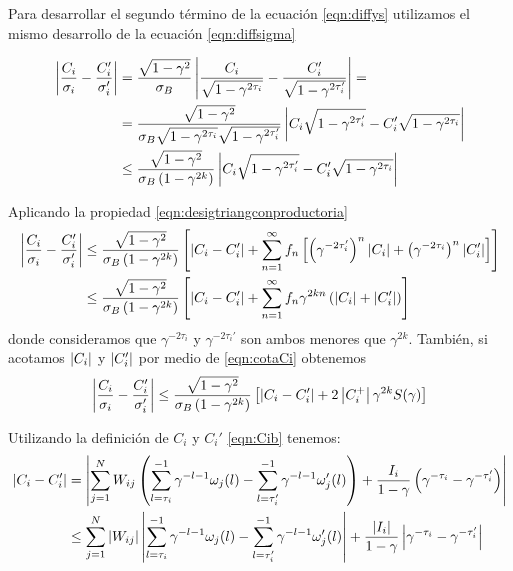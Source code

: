 Para desarrollar el segundo término de la ecuación \eqref{eqn:diffys} utilizamos el mismo desarrollo de la ecuación \eqref{eqn:diffsigma}

\begin{align}
\nonumber  \left|\frac{C_i}{\sigma_i} - \frac{C_i'}{\sigma_i'}\right| &=
    \frac{\sqrt{1-\gamma^2}}{\sigma_B}
    \left| \frac{C_i}{\sqrt{1-\gamma^{2\tau_i}}} - \frac{C_i'}{\sqrt{1-\gamma^{2\tau'_i}}} \right|=\\
\nonumber   &=\frac{\sqrt{1-\gamma^2}}{\sigma_B \sqrt{1-\gamma^{2\tau_i}}
    \sqrt{1-\gamma^{2\tau'_i}} }
    \left| C_i\sqrt{1-\gamma^{2\tau'_i}} - C_i'\sqrt{1-\gamma^{2\tau_i} }\right| \\
    & \leq  \frac{\sqrt{1-\gamma^2}}{\sigma_B \left(1-\gamma^{2k}\right)}
    \left| C_i\sqrt{1-\gamma^{2\tau'_i}} - C_i'\sqrt{1-\gamma^{2\tau_i} }\right|
\end{align}


Aplicando la propiedad \eqref{eqn:desigtriangconproductoria} 
\begin{align*}
    \left|\frac{C_i}{\sigma_i} - \frac{C_i'}{\sigma_i'}\right|
    & \leq  \frac{\sqrt{1-\gamma^2}}{\sigma_B \left(1-\gamma^{2k}\right)} 
    \left[ \left| C_i - C_i' \right| + \sum_{n=1}^{\infty} f_n \left[ \left( \gamma^{-2\tau_i'}\right)^n\left|C_i\right| + 
    \left( \gamma^{-2\tau_i}\right)^n\left|C_i'\right| \right] \right] \\
    &\leq \frac{\sqrt{1-\gamma^2}}{\sigma_B \left(1-\gamma^{2k}\right)} 
    \left[ \left| C_i - C_i' \right| + \sum_{n=1}^{\infty} f_n \gamma^{2kn} \left( \left|C_i\right| + \left|C_i'\right| \right) \right]
    \end{align*}
donde consideramos que $\gamma^{-2\tau_i}$ y $\gamma^{-2\tau_i'}$ son ambos menores que $\gamma^{2k}$. También, si acotamos $\left|C_i\right|$ y $\left|C_i'\right|$ por medio de \eqref{eqn:cotaCi} obtenemos
\begin{equation}
    \left|\frac{C_i}{\sigma_i} - \frac{C_i'}{\sigma_i'}\right|
     \leq \frac{\sqrt{1-\gamma^2}}{\sigma_B \left(1-\gamma^{2k}\right)} 
    \left[ \left| C_i - C_i' \right| + 2 \left|C_i^+\right| \gamma^{2k} S(\gamma) \right] 
    \label{eqn:diffcispond}
\end{equation}

Utilizando la definición de $C_i$ y $C_i'$ \eqref{eqn:Cib} tenemos:
\begin{align}
\nonumber \left| C_i - C_i' \right| &= 
\left| \sum_{j=1}^N W_{ij} \left( \sum_{l=\tau_i}^{-1}\gamma^{-l-1} \omega_j(l) -\sum_{l=\tau_i'}^{-1} \gamma^{-l-1} \omega_j'(l) \right) + \frac{I_i}{1-\gamma} \left(\gamma^{-\tau_i} - \gamma^{-\tau_i'} \right) \right|\\
&\leq \sum_{j=1}^N \left|W_{ij}\right| \left| \sum_{l=\tau_i}^{-1}\gamma^{-l-1} \omega_j(l) -\sum_{l=\tau_i'}^{-1} \gamma^{-l-1} \omega_j'(l) \right| + \frac{\left|I_i\right|}{1-\gamma} \left|\gamma^{-\tau_i} - \gamma^{-\tau_i'} \right|
\label{eqn:diffcis}
\end{align}

